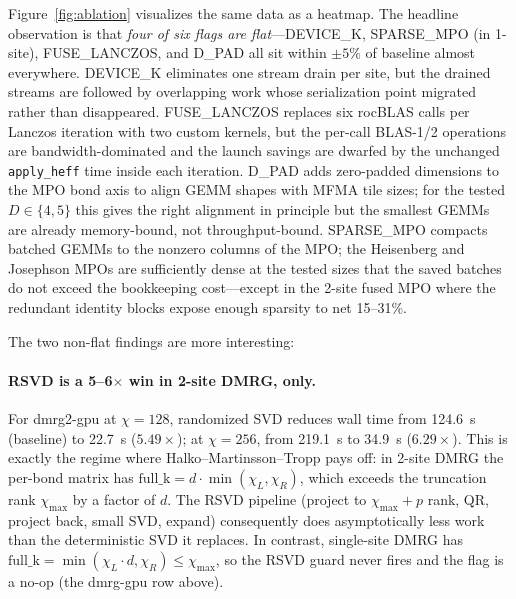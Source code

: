 \documentclass[preprint,12pt]{elsarticle}
\begin{document}
Figure~\ref{fig:ablation} visualizes the same data as a heatmap.
The headline observation is that \emph{four of six flags are flat}---DEVICE\_K, SPARSE\_MPO (in 1-site), FUSE\_LANCZOS, and D\_PAD all sit within $\pm 5\%$ of baseline almost everywhere.
DEVICE\_K eliminates one stream drain per site, but the drained streams are followed by overlapping work whose serialization point migrated rather than disappeared.
FUSE\_LANCZOS replaces six rocBLAS calls per Lanczos iteration with two custom kernels, but the per-call BLAS-1/2 operations are bandwidth-dominated and the launch savings are dwarfed by the unchanged \texttt{apply\_heff} time inside each iteration.
D\_PAD adds zero-padded dimensions to the MPO bond axis to align GEMM shapes with MFMA tile sizes; for the tested $D \in \{4, 5\}$ this gives the right alignment in principle but the smallest GEMMs are already memory-bound, not throughput-bound.
SPARSE\_MPO compacts batched GEMMs to the nonzero columns of the MPO; the Heisenberg and Josephson MPOs are sufficiently dense at the tested sizes that the saved batches do not exceed the bookkeeping cost---except in the 2-site fused MPO where the redundant identity blocks expose enough sparsity to net 15--31\%.

The two non-flat findings are more interesting:

\paragraph{RSVD is a 5--6$\times$ win in 2-site DMRG, only.}
For dmrg2-gpu at $\chi = 128$, randomized SVD reduces wall time from 124.6~s (baseline) to 22.7~s ($5.49\times$); at $\chi = 256$, from 219.1~s to 34.9~s ($6.29\times$).
This is exactly the regime where Halko--Martinsson--Tropp pays off: in 2-site DMRG the per-bond matrix has $\text{full\_k} = d \cdot \min(\chi_L, \chi_R)$, which exceeds the truncation rank $\chi_\text{max}$ by a factor of $d$.
The RSVD pipeline (project to $\chi_\text{max} + p$ rank, QR, project back, small SVD, expand) consequently does asymptotically less work than the deterministic SVD it replaces.
In contrast, single-site DMRG has $\text{full\_k} = \min(\chi_L \cdot d, \chi_R) \leq \chi_\text{max}$, so the RSVD guard never fires and the flag is a no-op (the dmrg-gpu row above).
\end{document}
